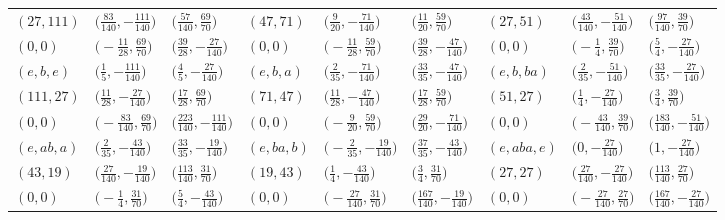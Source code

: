 \documentclass[pdftex]{sigma}
\theoremstyle{definition}
\numberwithin{equation}{section}
\begin{document}
\begin{landscape}
\begin{table}[th]
\begin{tabular}{|lll|lll|lll|}
\\
$(27, 111)$ & $\bigl(\frac{83}{140}, -\frac{111}{140}\bigr)$ & $\bigl(\frac{57}{140}, \frac{69}{70}\bigr)$ & $(47, 71)$ & $\bigl(\frac{9}{20}, -\frac{71}{140}\bigr)$ & $\bigl(\frac{11}{20}, \frac{59}{70}\bigr)$ & $(27, 51)$ & $\bigl(\frac{43}{140}, -\frac{51}{140}\bigr)$ & $\bigl(\frac{97}{140}, \frac{39}{70}\bigr)$
\\
$(0, 0)$ & $\bigl(-\frac{11}{28}, \frac{69}{70}\bigr)$ & $\bigl(\frac{39}{28}, -\frac{27}{140}\bigr)$ & $(0, 0)$ & $\bigl(-\frac{11}{28}, \frac{59}{70}\bigr)$ & $\bigl(\frac{39}{28}, -\frac{47}{140}\bigr)$ & $(0, 0)$ & $\bigl(-\frac{1}{4}, \frac{39}{70}\bigr)$ & $\bigl(\frac{5}{4}, -\frac{27}{140}\bigr)$
\\\hline
$(e, b, e)$ & $\bigl(\frac{1}{5}, -\frac{111}{140}\bigr)$ & $\bigl(\frac{4}{5}, -\frac{27}{140}\bigr)$ & $(e, b, a)$ & $\bigl(\frac{2}{35}, -\frac{71}{140}\bigr)$ & $\bigl(\frac{33}{35}, -\frac{47}{140}\bigr)$ & $(e, b, ba)$ & $\bigl(\frac{2}{35}, -\frac{51}{140}\bigr)$ & $\bigl(\frac{33}{35}, -\frac{27}{140}\bigr)$
\\
$(111, 27)$ & $\bigl(\frac{11}{28}, -\frac{27}{140}\bigr)$ & $\bigl(\frac{17}{28}, \frac{69}{70}\bigr)$ & $(71, 47)$ & $\bigl(\frac{11}{28}, -\frac{47}{140}\bigr)$ & $\bigl(\frac{17}{28}, \frac{59}{70}\bigr)$ & $(51, 27)$ & $\bigl(\frac{1}{4}, -\frac{27}{140}\bigr)$ & $\bigl(\frac{3}{4}, \frac{39}{70}\bigr)$
\\
$(0, 0)$ & $\bigl(-\frac{83}{140}, \frac{69}{70}\bigr)$ & $\bigl(\frac{223}{140}, -\frac{111}{140}\bigr)$ & $(0, 0)$ & $\bigl(-\frac{9}{20}, \frac{59}{70}\bigr)$ & $\bigl(\frac{29}{20}, -\frac{71}{140}\bigr)$ & $(0, 0)$ & $\bigl(-\frac{43}{140}, \frac{39}{70}\bigr)$ & $\bigl(\frac{183}{140}, -\frac{51}{140}\bigr)$
\\\hline
$(e, ab, a)$ & $\bigl(\frac{2}{35}, -\frac{43}{140}\bigr)$ & $\bigl(\frac{33}{35}, -\frac{19}{140}\bigr)$ & $(e, ba, b)$ & $\bigl(-\frac{2}{35}, -\frac{19}{140}\bigr)$ & $\bigl(\frac{37}{35}, -\frac{43}{140}\bigr)$ & $(e, aba, e)$ & $\bigl(0, -\frac{27}{140}\bigr)$ & $\bigl(1, -\frac{27}{140}\bigr)$
\\
$(43, 19)$ & $\bigl(\frac{27}{140}, -\frac{19}{140}\bigr)$ & $\bigl(\frac{113}{140}, \frac{31}{70}\bigr)$ & $(19, 43)$ & $\bigl(\frac{1}{4}, -\frac{43}{140}\bigr)$ & $\bigl(\frac{3}{4}, \frac{31}{70}\bigr)$ & $(27, 27)$ & $\bigl(\frac{27}{140}, -\frac{27}{140}\bigr)$ & $\bigl(\frac{113}{140}, \frac{27}{70}\bigr)$
\\
$(0, 0)$ & $\bigl(-\frac{1}{4}, \frac{31}{70}\bigr)$ & $\bigl(\frac{5}{4}, -\frac{43}{140}\bigr)$ & $(0, 0)$ & $\bigl(-\frac{27}{140}, \frac{31}{70}\bigr)$ & $\bigl(\frac{167}{140}, -\frac{19}{140}\bigr)$ & $(0, 0)$ & $\bigl(-\frac{27}{140}, \frac{27}{70}\bigr)$ & $\bigl(\frac{167}{140}, -\frac{27}{140}\bigr)$

\end{tabular}
\end{table}
\end{landscape}
\end{document}

